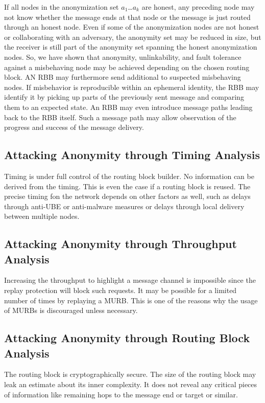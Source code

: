 If all nodes in the anonymization set $a_1$\ldots$a_k$ are honest, any preceding node may not know whether the message ends at that node or the message is just routed through an honest node. Even if some of the anonymization nodes are not honest or collaborating with an adversary, the anonymity set may be reduced in size, but the receiver is still part of the anonymity set spanning the honest anonymization nodes. So, we have shown that anonymity, unlinkability, and fault tolerance against a misbehaving node may be achieved depending on the chosen routing block. AN RBB may furthermore send additional \VortexMessages to suspected misbehaving nodes. If misbehavior is reproducible within an ephemeral identity, the RBB may identify it by picking up parts of the previously sent message and comparing them to an expected state. An RBB may even introduce message paths leading back to the RBB itself. Such a message path may allow observation of the progress and success of the message delivery.

\subsection{Attacking Anonymity through Timing Analysis}
Timing is under full control of the routing block builder. No information can be derived from the timing. This is even the case if a routing block is reused. The precise timing fon the network depends on other factors as well, such as delays through anti-UBE or anti-malware measures or delays through local delivery between multiple nodes.

\subsection{Attacking Anonymity through Throughput Analysis}
Increasing the throughput to highlight a message channel is impossible since the replay protection will block such requests. It may be possible for a limited number of times by replaying a MURB. This is one of the reasons why the usage of MURBs is discouraged unless necessary.

\subsection{Attacking Anonymity through Routing Block Analysis}
The routing block is cryptographically secure. The size of the routing block may leak an estimate about its inner complexity. It does not reveal any critical pieces of information like remaining hops to the message end or target or similar.

